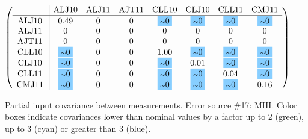 \begin{table}[H]
\scriptsize
\begin{center}
\renewcommand{\arraystretch}{1.1}
\begin{math}\left(\begin{array}{c|ccccccc}
 & \mathrm{ALJ10} & 
\mathrm{ALJ11} & 
\mathrm{AJT11} & 
\mathrm{CLL10} & 
\mathrm{CLJ10} & 
\mathrm{CLL11} & 
\mathrm{CMJ11} \\
\hline
\mathrm{ALJ10} \hspace*{2pt} &       0.49 &  0 &  0 &  \colorbox{SkyBlue1}{$ {\scriptstyle \sim }0$} &  \colorbox{SkyBlue1}{$ {\scriptstyle \sim }0$} &  \colorbox{SkyBlue1}{$ {\scriptstyle \sim }0$} &  \colorbox{SkyBlue1}{$ {\scriptstyle \sim }0$} \\
\mathrm{ALJ11} \hspace*{2pt} &  0 &  0 &  0 &  0 &  0 &  0 &  0 \\
\mathrm{AJT11} \hspace*{2pt} &  0 &  0 &  0 &  0 &  0 &  0 &  0 \\
\mathrm{CLL10} \hspace*{2pt} &  \colorbox{SkyBlue1}{$ {\scriptstyle \sim }0$} &  0 &  0 &       1.00 &  \colorbox{SkyBlue1}{$ {\scriptstyle \sim }0$} &  \colorbox{SkyBlue1}{$ {\scriptstyle \sim }0$} &  \colorbox{SkyBlue1}{$ {\scriptstyle \sim }0$} \\
\mathrm{CLJ10} \hspace*{2pt} &  \colorbox{SkyBlue1}{$ {\scriptstyle \sim }0$} &  0 &  0 &  \colorbox{SkyBlue1}{$ {\scriptstyle \sim }0$} &       0.01 &  \colorbox{SkyBlue1}{$ {\scriptstyle \sim }0$} &  \colorbox{SkyBlue1}{$ {\scriptstyle \sim }0$} \\
\mathrm{CLL11} \hspace*{2pt} &  \colorbox{SkyBlue1}{$ {\scriptstyle \sim }0$} &  0 &  0 &  \colorbox{SkyBlue1}{$ {\scriptstyle \sim }0$} &  \colorbox{SkyBlue1}{$ {\scriptstyle \sim }0$} &       0.04 &  \colorbox{SkyBlue1}{$ {\scriptstyle \sim }0$} \\
\mathrm{CMJ11} \hspace*{2pt} &  \colorbox{SkyBlue1}{$ {\scriptstyle \sim }0$} &  0 &  0 &  \colorbox{SkyBlue1}{$ {\scriptstyle \sim }0$} &  \colorbox{SkyBlue1}{$ {\scriptstyle \sim }0$} &  \colorbox{SkyBlue1}{$ {\scriptstyle \sim }0$} &       0.16 \\
\end{array}\right)\end{math}
\caption{Partial input covariance between measurements. Error source \#17: MHI. Color boxes indicate covariances lower than nominal values by a factor up to 2 (green), up to 3 (cyan) or greater than 3 (blue).}
\renewcommand{\arraystretch}{1}
\end{center}
\end{table}
\clearpage
